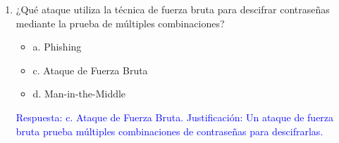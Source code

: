 \documentclass[a4paper]{article}
\begin{document}
\begin{enumerate}
    \item ¿Qué ataque utiliza la técnica de fuerza bruta para descifrar contraseñas mediante la prueba de múltiples combinaciones?
    \begin{itemize}
        \item a. Phishing
        \item c. Ataque de Fuerza Bruta
        \item d. Man-in-the-Middle
    \end{itemize}
    \textcolor{blue}{Respuesta: c. Ataque de Fuerza Bruta. Justificación: Un ataque de fuerza bruta prueba múltiples combinaciones de contraseñas para descifrarlas.}
    \vspace{1cm}
    \vspace{1cm}


\end{enumerate}
\end{document}
